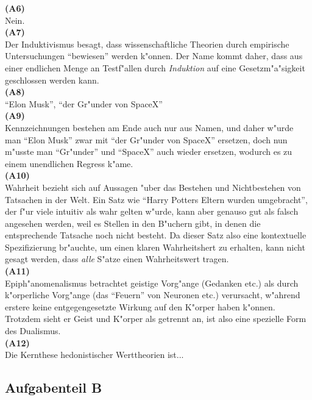 \documentclass[a4paper]{article}
\begin{document}
\noindent\textbf{(A6)}\\
\noindent Nein.\\

\noindent\textbf{(A7)}\\
\noindent Der Induktivismus besagt, dass wissenschaftliche Theorien durch empirische Untersuchungen "`bewiesen"' werden k"onnen. Der Name kommt daher, dass aus einer endlichen Menge an Testf"allen durch \emph{Induktion} auf eine Gesetzm"a"sigkeit geschlossen werden kann.\\

\noindent\textbf{(A8)}\\
\noindent "`Elon Musk"', "`der Gr"under von SpaceX"'\\

\noindent\textbf{(A9)}\\
\noindent Kennzeichnungen bestehen am Ende auch nur aus Namen, und daher w"urde man "`Elon Musk"' zwar mit "`der Gr"under von SpaceX"' ersetzen, doch nun m"usste man "`Gr"under"' und "`SpaceX"' auch wieder ersetzen, wodurch es zu einem unendlichen Regress k"ame.\\

\noindent\textbf{(A10)}\\
\noindent Wahrheit bezieht sich auf Aussagen "uber das Bestehen und Nichtbestehen von Tatsachen in der Welt. Ein Satz wie  "`Harry Potters Eltern wurden umgebracht"', der f"ur viele intuitiv als wahr gelten w"urde, kann aber genauso gut als falsch angesehen werden, weil es Stellen in den B"uchern gibt, in denen die entsprechende Tatsache noch nicht besteht. Da dieser Satz also eine kontextuelle Spezifizierung br"auchte, um einen klaren Wahrheitshert zu erhalten, kann nicht gesagt werden, dass \emph{alle} S"atze einen Wahrheitswert tragen.\\

\noindent\textbf{(A11)}\\
\noindent Epiph"anomenalismus betrachtet geistige Vorg"ange (Gedanken etc.) als durch k"orperliche Vorg"ange (das "`Feuern"' von Neuronen etc.) verursacht, w"ahrend erstere keine entgegengesetzte Wirkung auf den K"orper haben k"onnen. Trotzdem sieht er Geist und K"orper als getrennt an, ist also eine spezielle Form des Dualismus.\\

\noindent\textbf{(A12)}\\
\noindent Die Kernthese hedonistischer Werttheorien ist...\\

\subsection*{Aufgabenteil B}
\end{document}
